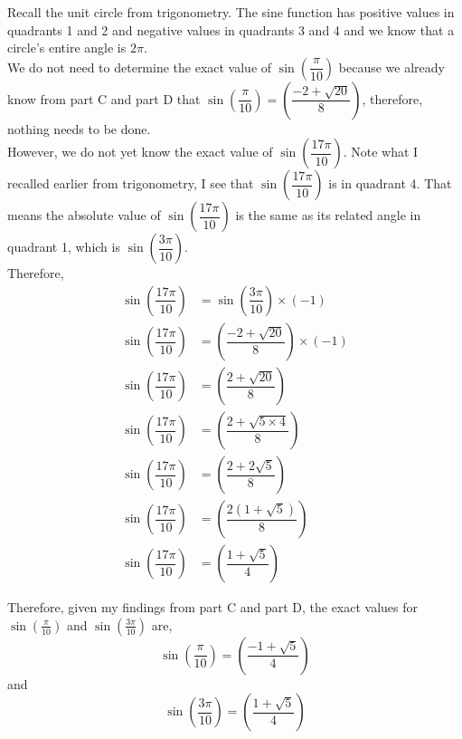 \documentclass[12pt]{book}
\begin{document}
\begin{enumerate}
\begin{enumerate}
Recall the unit circle from trigonometry. The sine function has positive values in quadrants 1 and 2 and negative values in quadrants 3 and 4 and we know that a circle's entire angle is $2\pi$.\\

We do not need to determine the exact value of $\sin\left(\dfrac{\pi}{10}\right)$ because we already know from part C and part D that $\sin\left(\dfrac{\pi}{10}\right) = \left(\dfrac{-2 + \sqrt{20}}{8}\right)$, therefore, nothing needs to be done.\\

However, we do not yet know the exact value of $\sin\left(\dfrac{17\pi}{10}\right)$. Note what I recalled earlier from trigonometry, I see that $\sin\left(\dfrac{17\pi}{10}\right)$ is in quadrant 4. That means the absolute value of $\sin\left(\dfrac{17\pi}{10}\right)$ is the same as its related angle in quadrant 1, which is $\sin\left(\dfrac{3\pi}{10}\right)$.\\

Therefore,
\setcounter{equation}{0}
\begin{align}
    \sin\left(\dfrac{17\pi}{10}\right) &= \sin\left(\dfrac{3\pi}{10}\right) \times (-1) \\
    \sin\left(\dfrac{17\pi}{10}\right) &= \left(\dfrac{-2 + \sqrt{20}}{8}\right) \times (-1) \\
    \sin\left(\dfrac{17\pi}{10}\right) &= \left(\dfrac{2 + \sqrt{20}}{8}\right) \\
    \sin\left(\dfrac{17\pi}{10}\right) &= \left(\dfrac{2 + \sqrt{5\times4}}{8}\right) \\
    \sin\left(\dfrac{17\pi}{10}\right) &= \left(\dfrac{2 + 2\sqrt{5}}{8}\right) \\
    \sin\left(\dfrac{17\pi}{10}\right) &= \left(\dfrac{2(1 + \sqrt{5})}{8}\right) \\
    \sin\left(\dfrac{17\pi}{10}\right) &= \left(\dfrac{1 + \sqrt{5}}{4}\right)
\end{align}

Therefore, given my findings from part C and part D, the exact values for $\sin(\frac{\pi}{10})$ and $\sin(\frac{3\pi}{10})$ are,
$$\sin\left(\dfrac{\pi}{10}\right) = \left(\dfrac{-1 + \sqrt{5}}{4}\right)$$ and $$\sin\left(\dfrac{3\pi}{10}\right) = \left(\dfrac{1 + \sqrt{5}}{4}\right)$$

\end{enumerate}


\newpage


\end{enumerate}
\end{document}
